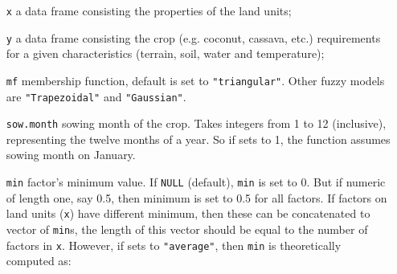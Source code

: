 \documentclass[11pt,fleqn]{article}\usepackage[]{graphicx}\usepackage[]{color}
\begin{document}
\begin{itemize}[leftmargin=\dimexpr\linewidth-11.8cm-\rightmargin\relax]
\item[\texttt{x}] a data frame consisting the properties of the land units;
\item[\texttt{y}] a data frame consisting the crop (e.g. coconut, cassava, etc.) requirements for a given characteristics (terrain, soil, water and temperature);
\item[\texttt{mf}] membership function, default is set to \verb|"triangular"|. Other fuzzy models are \verb|"Trapezoidal"| and \verb|"Gaussian"|.
\item[\texttt{sow.month}] sowing month of the crop. Takes integers from 1 to 12 (inclusive), representing the twelve months of a year. So if sets to 1, the function assumes sowing month on January.
\item[\texttt{min}] factor's minimum value. If \verb|NULL| (default), \verb|min| is set to 0. But if numeric of length one, say 0.5, then minimum is set to 0.5 for all factors. If factors on land units (\verb|x|) have different minimum, then these can be concatenated to vector of \verb|min|s, the length of this vector should be equal to the number of factors in \verb|x|. However, if sets to \verb|"average"|, then \verb|min| is theoretically computed as:\\


\end{itemize}
\end{document}
